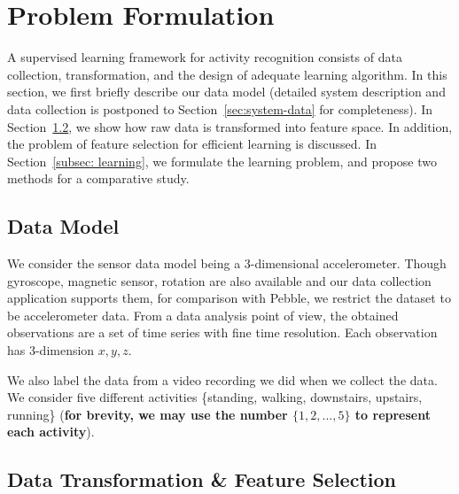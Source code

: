 \section{Problem Formulation}
\label{sec:problem-formulation}

A supervised learning framework for activity recognition consists of data collection, transformation, and the design of adequate learning algorithm. In this section, we first briefly describe our data model (detailed system description and data collection is postponed to Section~\ref{sec:system-data} for completeness). In Section~\ref{subsec: data-transform}, we show how raw data is transformed into feature space. In addition, the problem of feature selection for efficient learning is discussed. In Section~\ref{subsec: learning}, we formulate the learning problem, and propose two methods for a comparative study.  

\subsection{Data Model}
\label{subsec: data-model}
We consider the sensor data model being a 3-dimensional accelerometer. Though gyroscope, magnetic sensor, rotation are also available and our data collection application supports them, for comparison with Pebble, we restrict the dataset to be accelerometer data. From a data analysis point of view, the obtained observations are a set of time series with fine time resolution. Each observation has 3-dimension $x, y, z$. 

We also label the data from a video recording we did when we collect the data. We consider five different activities \{standing, walking, downstairs, upstairs, running\} ({\bf for brevity, we may use the number $\{1,2,...,5\}$ to represent each activity}). 

\subsection{Data Transformation \& Feature Selection}
\label{subsec: data-transform}

